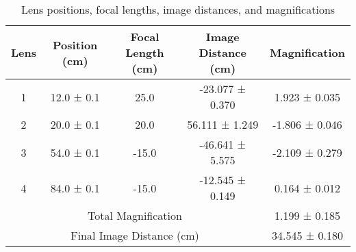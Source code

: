
\begin{table}[h]
\centering
\begin{tabular}{|c|c|c|c|c|}
\hline
Lens & Position (cm) & Focal Length (cm) & Image Distance (cm) & Magnification \\
\hline
1 & 12.0 ± 0.1 & 25.0 & -23.077 ± 0.370 & 1.923 ± 0.035 \\
2 & 20.0 ± 0.1 & 20.0 & 56.111 ± 1.249 & -1.806 ± 0.046 \\
3 & 54.0 ± 0.1 & -15.0 & -46.641 ± 5.575 & -2.109 ± 0.279 \\
4 & 84.0 ± 0.1 & -15.0 & -12.545 ± 0.149 & 0.164 ± 0.012 \\

\hline
\multicolumn{4}{|c|}{Total Magnification} & 1.199 ± 0.185 \\

\hline
\multicolumn{4}{|c|}{Final Image Distance (cm)} & 34.545 ± 0.180 \\

\hline
\end{tabular}
\caption{Lens positions, focal lengths, image distances, and magnifications}
\label{tab:lens_system}
\end{table}
